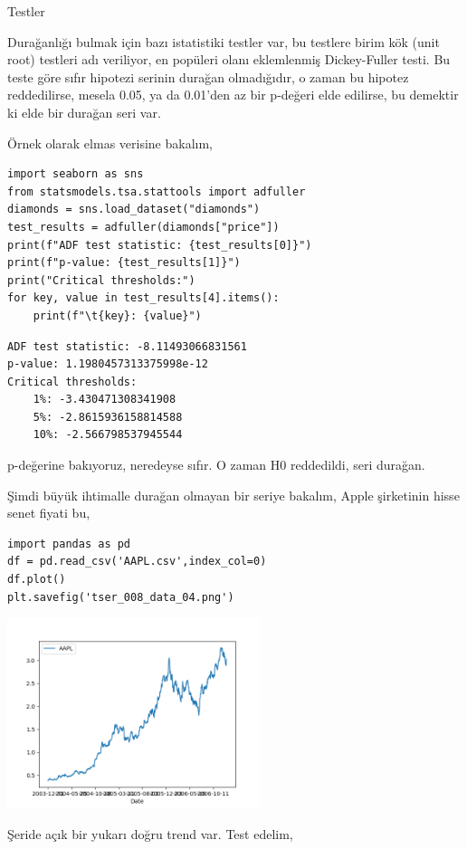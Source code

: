 \documentclass[12pt,fleqn]{article}\usepackage{../../common}
\begin{document}
Testler

Durağanlığı bulmak için bazı istatistiki testler var, bu testlere birim kök
(unit root) testleri adı veriliyor, en popüleri olanı eklemlenmiş Dickey-Fuller
testi. Bu teste göre sıfır hipotezi serinin durağan olmadığıdır, o zaman bu
hipotez reddedilirse, mesela 0.05, ya da 0.01'den az bir p-değeri elde edilirse,
bu demektir ki elde bir durağan seri var. 

Örnek olarak elmas verisine bakalım,

\begin{verbatim}
import seaborn as sns
from statsmodels.tsa.stattools import adfuller
diamonds = sns.load_dataset("diamonds")
test_results = adfuller(diamonds["price"])
print(f"ADF test statistic: {test_results[0]}")
print(f"p-value: {test_results[1]}")
print("Critical thresholds:")
for key, value in test_results[4].items():
    print(f"\t{key}: {value}")
\end{verbatim}

\begin{verbatim}
ADF test statistic: -8.11493066831561
p-value: 1.1980457313375998e-12
Critical thresholds:
	1%: -3.430471308341908
	5%: -2.8615936158814588
	10%: -2.566798537945544
\end{verbatim}

p-değerine bakıyoruz, neredeyse sıfır. O zaman H0 reddedildi, seri durağan.

Şimdi büyük ihtimalle durağan olmayan bir seriye bakalım, Apple şirketinin
hisse senet fiyati bu,

\begin{verbatim}
import pandas as pd
df = pd.read_csv('AAPL.csv',index_col=0)
df.plot()
plt.savefig('tser_008_data_04.png')
\end{verbatim}

\includegraphics[width=20em]{tser_008_data_04.png}

Şeride açık bir yukarı doğru trend var. Test edelim,
\end{document}

